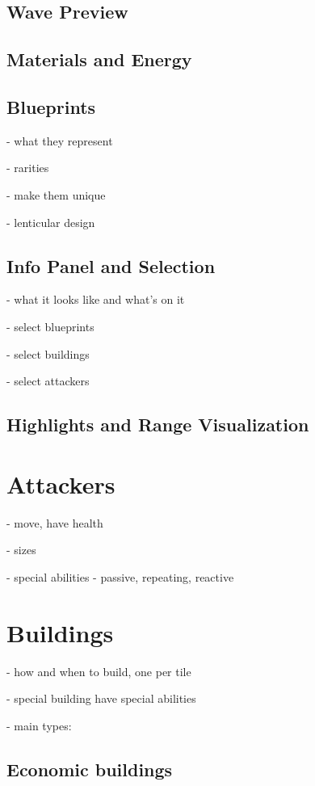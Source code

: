 \subsection{Wave Preview}

\subsection{Materials and Energy}

\subsection{Blueprints}

- what they represent

- rarities

- make them unique

- lenticular design

\subsection{Info Panel and Selection}

- what it looks like and what's on it

- select blueprints

- select buildings

- select attackers

\subsection{Highlights and Range Visualization}

\section{Attackers}

- move, have health

- sizes

- special abilities - passive, repeating, reactive

\section{Buildings}

- how and when to build, one per tile

- special building have special abilities

- main types:

\subsection{Economic buildings}

